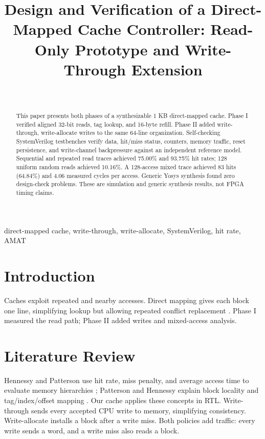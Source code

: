 \documentclass[conference]{IEEEtran}
\begin{document}
\title{Design and Verification of a Direct-Mapped Cache Controller: Read-Only Prototype and Write-Through Extension}
\author{\\
}
\maketitle

\begin{abstract}
This paper presents both phases of a synthesizable 1 KB direct-mapped cache. Phase I verified aligned 32-bit reads, tag lookup, and 16-byte refill. Phase II added write-through, write-allocate writes to the same 64-line organization. Self-checking SystemVerilog testbenches verify data, hit/miss status, counters, memory traffic, reset persistence, and write-channel backpressure against an independent reference model. Sequential and repeated read traces achieved 75.00\% and 93.75\% hit rates; 128 uniform random reads achieved 10.16\%. A 128-access mixed trace achieved 83 hits (64.84\%) and 4.06 measured cycles per access. Generic Yosys synthesis found zero design-check problems. These are simulation and generic synthesis results, not FPGA timing claims.
\end{abstract}
\begin{IEEEkeywords}
direct-mapped cache, write-through, write-allocate, SystemVerilog, hit rate, AMAT
\end{IEEEkeywords}

\section{Introduction}
Caches exploit repeated and nearby accesses. Direct mapping gives each block one line, simplifying lookup but allowing repeated conflict replacement \cite{hennessy,patterson}. Phase I measured the read path; Phase II added writes and mixed-access analysis.

\section{Literature Review}
Hennessy and Patterson use hit rate, miss penalty, and average access time to evaluate memory hierarchies \cite{hennessy}; Patterson and Hennessy explain block locality and tag/index/offset mapping \cite{patterson}. Our cache applies these concepts in RTL. Write-through sends every accepted CPU write to memory, simplifying consistency. Write-allocate installs a block after a write miss. Both policies add traffic: every write sends a word, and a write miss also reads a block.
\end{document}
